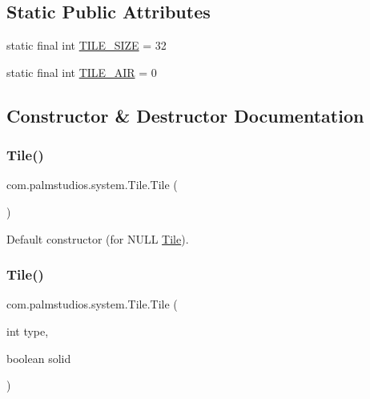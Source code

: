 \subsection*{Static Public Attributes}
\begin{DoxyCompactItemize}
\item 
static final int \hyperlink{classcom_1_1palmstudios_1_1system_1_1_tile_aae4ab12b21c96fe4796978dc3ba6f8dc}{T\+I\+L\+E\+\_\+\+S\+I\+ZE} = 32
\item 
static final int \hyperlink{classcom_1_1palmstudios_1_1system_1_1_tile_aabd6b124b560b2eb2216651836856c91}{T\+I\+L\+E\+\_\+\+A\+IR} = 0
\end{DoxyCompactItemize}


\subsection{Constructor \& Destructor Documentation}
\mbox{\label{classcom_1_1palmstudios_1_1system_1_1_tile_a737cb577ebba27d436f95e9525748560}} 
\subsubsection{\texorpdfstring{Tile()}{Tile()}\hspace{0.1cm}{\footnotesize\ttfamily [1/3]}}
{\footnotesize\ttfamily com.\+palmstudios.\+system.\+Tile.\+Tile (\begin{DoxyParamCaption}{ }\end{DoxyParamCaption})}

Default constructor (for N\+U\+LL \hyperlink{classcom_1_1palmstudios_1_1system_1_1_tile}{Tile}). \mbox{\label{classcom_1_1palmstudios_1_1system_1_1_tile_a72b3fda25e7edae6f3d2bc8d78a70c49}} 
\subsubsection{\texorpdfstring{Tile()}{Tile()}\hspace{0.1cm}{\footnotesize\ttfamily [2/3]}}
{\footnotesize\ttfamily com.\+palmstudios.\+system.\+Tile.\+Tile (\begin{DoxyParamCaption}\item[{int}]{type,  }\item[{boolean}]{solid }\end{DoxyParamCaption})}


